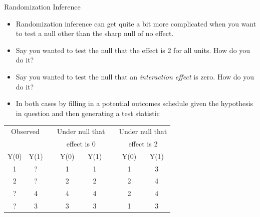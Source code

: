 \documentclass[
  11pt,
  ignorenonframetext,
]{beamer}
\begin{document}
\begin{frame}{Randomization Inference}
\protect\hypertarget{randomization-inference-8}{}
\begin{itemize}\small
\item Randomization inference can get quite a bit more complicated when you want to test a null other than the sharp null of no effect.
\item Say you wanted to test the null that the effect is 2 for all units. How do you do it?
\item Say you wanted to test the null that an \textit{interaction effect} is zero. How do you do it?
\item In both cases by filling in a potential outcomes schedule given the hypothesis in question and then generating a test statistic
\end{itemize}
\bigskip

\begin{table}
\centering
\begin{tabular}{cccccccc}

\multicolumn{ 2}{c}{Observed} &            & \multicolumn{ 2}{c}{Under null that } &            & \multicolumn{ 2}{c}{Under null that } \\

           &            &            & \multicolumn{ 2}{c}{effect is 0} &            & \multicolumn{ 2}{c}{effect is 2} \\  \hline

      Y(0) &       Y(1) &            &       Y(0) &       Y(1) &            &       Y(0) &       Y(1) \\

         1 &          ? &            &          1 &          1 &            &          1 &          3 \\

         2 &          ? &            &          2 &          2 &            &          2 &          4 \\

         ? &          4 &            &          4 &          4 &            &          2 &          4 \\

         ? &          3 &            &          3 &          3 &            &          1 &          3 \\

\end{tabular}  
\end{table}
\end{frame}
\end{document}

